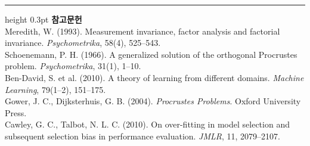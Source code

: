 \documentclass[10pt]{article}
\begin{document}
\vspace{0.6em}
\hrule height 0.3pt
\vspace{0.5em}
{\footnotesize
\textbf{참고문헌}\\[0.3em]
Meredith, W. (1993). Measurement invariance, factor analysis and factorial
invariance. \emph{Psychometrika}, 58(4), 525--543.\\[0.15em]
Schoenemann, P. H. (1966). A generalized solution of the orthogonal Procrustes
problem. \emph{Psychometrika}, 31(1), 1--10.\\[0.15em]
Ben-David, S. et al. (2010). A theory of learning from different domains.
\emph{Machine Learning}, 79(1--2), 151--175.\\[0.15em]
Gower, J. C., Dijksterhuis, G. B. (2004). \emph{Procrustes Problems}.
Oxford University Press.\\[0.15em]
Cawley, G. C., Talbot, N. L. C. (2010). On over-fitting in model selection and
subsequent selection bias in performance evaluation. \emph{JMLR}, 11, 2079--2107.
}
\end{document}
